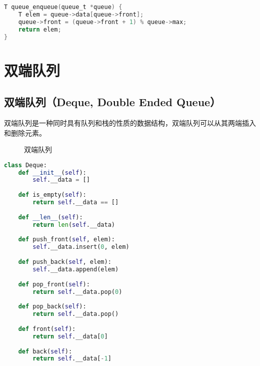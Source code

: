 \vspace{0.5cm}


\begin{lstlisting}[language=C]
T queue_enqueue(queue_t *queue) {
	T elem = queue->data[queue->front];
	queue->front = (queue->front + 1) % queue->max;
	return elem;
}
\end{lstlisting}

\newpage

\section{双端队列}

\subsection{双端队列（Deque, Double Ended Queue）}

双端队列是一种同时具有队列和栈的性质的数据结构，双端队列可以从其两端插入和删除元素。

\begin{figure}[H]
	\centering
	\caption{双端队列}
\end{figure}


\begin{lstlisting}[language=Python]
class Deque:
    def __init__(self):
        self.__data = []
    
    def is_empty(self):
        return self.__data == []
    
    def __len__(self):
        return len(self.__data)
    
    def push_front(self, elem):
        self.__data.insert(0, elem)
    
    def push_back(self, elem):
        self.__data.append(elem)
    
    def pop_front(self):
        return self.__data.pop(0)
    
    def pop_back(self):
        return self.__data.pop()
    
    def front(self):
        return self.__data[0]
    
    def back(self):
        return self.__data[-1]
\end{lstlisting}

\newpage